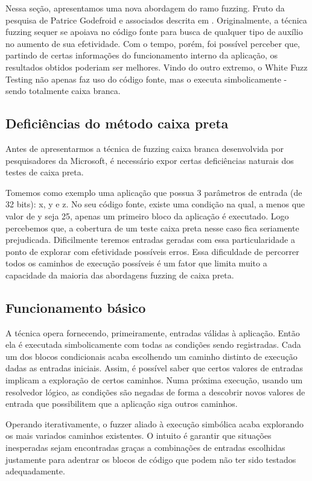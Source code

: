 		Nessa seção, apresentamos uma nova abordagem do ramo fuzzing.
		Fruto da pesquisa de Patrice Godefroid e associados descrita em \cite{Godefroid2008}.
		Originalmente, a técnica fuzzing sequer se apoiava no código fonte para busca
		de qualquer tipo de auxílio no aumento de sua efetividade.	
		Com o tempo, porém, foi possível perceber que, partindo de certas informações
		do funcionamento interno da aplicação, os resultados obtidos poderiam ser melhores.
		Vindo do outro extremo, o White Fuzz Testing não apenas faz uso do código fonte,
		mas o executa simbolicamente - sendo totalmente caixa branca.  
		
		\subsection{Deficiências do método caixa preta}
			Antes de apresentarmos a técnica de fuzzing caixa branca desenvolvida
			por pesquisadores da Microsoft, é necessário expor certas deficiências naturais dos
			testes de caixa preta.
			
			Tomemos como exemplo uma aplicação que possua 3 parâmetros de entrada (de 32 bits): x, y e z.
			No seu código fonte, existe uma condição na qual, a menos que valor de y seja 25, apenas
			um primeiro bloco da aplicação é executado. Logo percebemos que, a cobertura de um teste
			caixa preta nesse caso fica seriamente prejudicada. Dificilmente teremos entradas
			geradas com essa particularidade a ponto de explorar com efetividade possíveis erros.
			Essa dificuldade de percorrer todos os caminhos de execução possíveis
			é um fator que limita muito a capacidade da maioria das abordagens fuzzing de caixa preta.

		\subsection{Funcionamento básico}
			A técnica opera fornecendo, primeiramente, entradas válidas à aplicação.
			Então ela é executada simbolicamente com todas as condições sendo registradas.
			Cada um dos blocos condicionais acaba escolhendo um caminho distinto de execução
			dadas as entradas iniciais. Assim, é possível saber que certos valores de entradas
			implicam a exploração de certos caminhos. Numa próxima execução, usando um resolvedor
			lógico, as condições são negadas de forma a descobrir novos valores de entrada
			que possibilitem que a aplicação siga outros caminhos.

			
			Operando iterativamente, o fuzzer aliado à execução simbólica acaba explorando
			os mais variados caminhos existentes.
			O intuito é garantir que situações inesperadas sejam encontradas graças a combinações
			de entradas escolhidas justamente para adentrar os blocos de código que podem
			não ter sido testados adequadamente.
			
